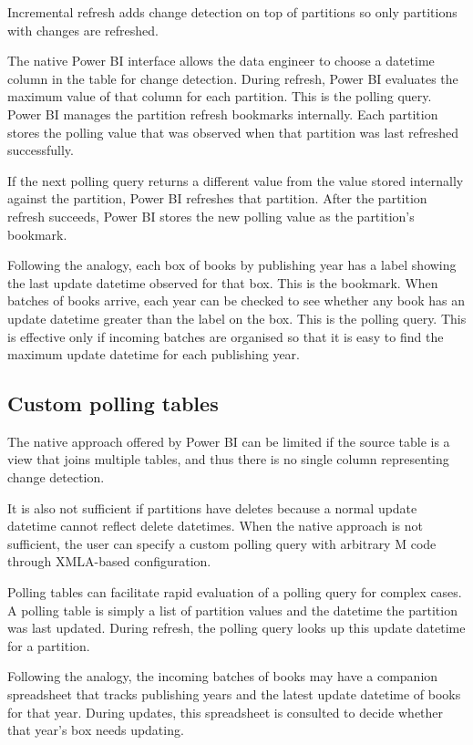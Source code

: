 \documentclass[10pt,openany,10pt]{book}
\begin{document}
Incremental refresh adds change detection on top of partitions so only
partitions with changes are refreshed.

The native Power BI interface allows the data engineer to choose a
datetime column in the table for change detection. During refresh, Power
BI evaluates the maximum value of that column for each partition. This
is the polling query. Power BI manages the partition refresh bookmarks
internally. Each partition stores the polling value that was observed
when that partition was last refreshed successfully.

If the next polling query returns a different value from the value
stored internally against the partition, Power BI refreshes that
partition. After the partition refresh succeeds, Power BI stores the new
polling value as the partition's bookmark.

Following the analogy, each box of books by publishing year has a label
showing the last update datetime observed for that box. This is the
bookmark. When batches of books arrive, each year can be checked to see
whether any book has an update datetime greater than the label on the
box. This is the polling query. This is effective only if incoming
batches are organised so that it is easy to find the maximum update
datetime for each publishing year.

\subsection{Custom polling tables}\label{custom-polling-tables}

The native approach offered by Power BI can be limited if the source
table is a view that joins multiple tables, and thus there is no single
column representing change detection.

It is also not sufficient if partitions have deletes because a normal
update datetime cannot reflect delete datetimes. When the native
approach is not sufficient, the user can specify a custom polling query
with arbitrary M code through XMLA-based configuration.

Polling tables can facilitate rapid evaluation of a polling query for
complex cases. A polling table is simply a list of partition values and
the datetime the partition was last updated. During refresh, the polling
query looks up this update datetime for a partition.

Following the analogy, the incoming batches of books may have a
companion spreadsheet that tracks publishing years and the latest update
datetime of books for that year. During updates, this spreadsheet is
consulted to decide whether that year's box needs updating.
\end{document}
